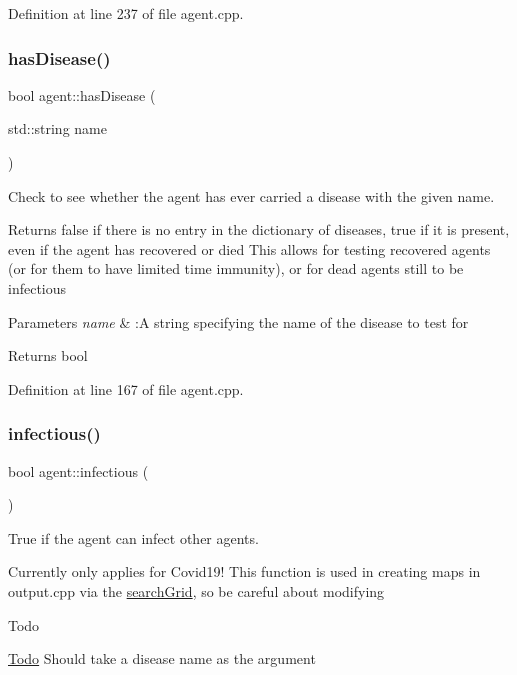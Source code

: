 Definition at line 237 of file agent.\+cpp.

\mbox{\label{classagent_aab67fe9df4777af3690138fa97d0a3a1}} 
\subsubsection{\texorpdfstring{has\+Disease()}{hasDisease()}}
{\footnotesize\ttfamily bool agent\+::has\+Disease (\begin{DoxyParamCaption}\item[{std\+::string}]{name }\end{DoxyParamCaption})}



Check to see whether the agent has ever carried a disease with the given name. 

Returns false if there is no entry in the dictionary of diseases, true if it is present, even if the agent has recovered or died This allows for testing recovered agents (or for them to have limited time immunity), or for dead agents still to be infectious


\begin{DoxyParams}{Parameters}
{\em name} & \+:A string specifying the name of the disease to test for \\
\hline
\end{DoxyParams}
\begin{DoxyReturn}{Returns}
bool 
\end{DoxyReturn}


Definition at line 167 of file agent.\+cpp.

\mbox{\label{classagent_ae186a297218e835ac064bf7a329d5b42}} 
\subsubsection{\texorpdfstring{infectious()}{infectious()}}
{\footnotesize\ttfamily bool agent\+::infectious (\begin{DoxyParamCaption}{ }\end{DoxyParamCaption})}



True if the agent can infect other agents. 

Currently only applies for Covid19! This function is used in creating maps in output.\+cpp via the \mbox{\hyperlink{classsearchGrid}{search\+Grid}}, so be careful about modifying \begin{DoxyRefDesc}{Todo}
\item[\mbox{\hyperlink{todo__todo000002}{Todo}}]Should take a disease name as the argument\end{DoxyRefDesc}


